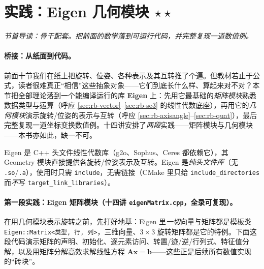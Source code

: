 \section{实践：Eigen 几何模块 \texorpdfstring{$\star\star$}{**}}
\label{sec:rb-eigen}
\noindent\emph{节首导读：骨干配套。把前面的数学落到可运行代码，并完整复现一道数值例。}

\paragraph{桥接：从纸面到代码。}前面十节我们在纸上把旋转、位姿、各种表示及其互转推了个遍。但教材若止于公式，读者很难真正“相信”这些抽象对象——它们到底长什么样、算起来对不对？本节把全部理论落到一个能编译运行的库 \textbf{Eigen} 上：先用它最基础的\emph{矩阵模块}熟悉数据类型与运算（呼应 \cref{sec:rb-vector}--\cref{sec:rb-se3} 的线性代数底座），再用它的\emph{几何模块}演示旋转/位姿的表示与互转（呼应 \cref{sec:rb-axisangle}--\cref{sec:rb-quat}），最后完整复现一道坐标变换数值例。十四讲安排了\emph{两段}实践——矩阵模块与几何模块——本书亦如此，缺一不可。

Eigen 是 C++ 头文件线性代数库（g2o、Sophus、Ceres 都依赖它），其 Geometry 模块直接提供各旋转/位姿表示及互转。Eigen 是\emph{纯头文件库}（无 \texttt{.so}/\texttt{.a}），使用时只需 \texttt{include}，无需链接（CMake 里只给 \texttt{include\_directories} 而\emph{不}写 \texttt{target\_link\_libraries}）\cite{gaoxiang2019slam14}。

\paragraph{第一段实践：Eigen 矩阵模块（十四讲 \texttt{eigenMatrix.cpp}，全录可复现）。}在用几何模块表示旋转之前，先打好地基：Eigen 里\emph{一切}向量与矩阵都是模板类 \texttt{Eigen::Matrix<类型, 行, 列>}，三维向量、$3\times3$ 旋转矩阵都是它的特例。下面这段代码演示矩阵的声明、初始化、逐元素访问、转置/迹/逆/行列式、特征值分解，以及用矩阵分解高效求解线性方程 $\mathbf{A}\mathbf{x}=\mathbf{b}$——这些正是后续所有数值实现的“砖块”。

